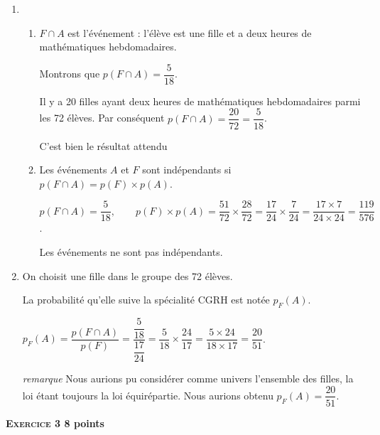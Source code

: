 \documentclass[10pt,a4paper]{article}
\begin{document}
\begin{enumerate}
\item 
	\begin{enumerate}
		\item  $F \cap A$ est l'événement : \og l'élève est une fille et a deux heures de mathématiques hebdomadaires\fg .

Montrons que $p(F \cap A) =  \dfrac{5}{18}$.
 
 Il y a 20 filles ayant deux heures de mathématiques hebdomadaires  parmi les 72 élèves. Par conséquent $p(F\cap A)=\dfrac{20}{72}=\dfrac{5}{18}$. 
 
 C'est bien le résultat attendu
		\item Les événements $A$ et $F$ sont indépendants si $p(F \cap A)=p(F)\times p(A)$.
		
	$p(F \cap A) =  \dfrac{5}{18},\qquad p(F)\times p(A)=\dfrac{51}{72}\times \dfrac{28}{72}=\dfrac{17}{24}\times \dfrac{7}{24}=\dfrac{17\times7}{24\times 24}= \dfrac{119}{576}$.
	
	Les événements ne sont pas indépendants.	
	\end{enumerate}
\item On choisit une fille dans le groupe des 72 élèves.

La probabilité qu'elle  suive la spécialité CGRH  est notée $p_{F}(A)$.

 $p_{F}(A)=\dfrac{p(F \cap A)}{p(F)}=\dfrac{\dfrac{5}{18}}{\dfrac{17}{24}}=\dfrac{5}{18}\times\dfrac{24}{17}=\dfrac{5\times24}{18\times17}=\dfrac{20}{51}$.
 
 
 {\scriptsize \emph{remarque} Nous aurions pu considérer comme univers l'ensemble des filles, la loi étant toujours la loi équirépartie. Nous aurions obtenu $p_{F}(A)=\dfrac{20}{51}$.}
\end{enumerate}

\vspace{0,5cm}

\textbf{\textsc{Exercice 3} \hfill 8 points}
\end{document}
